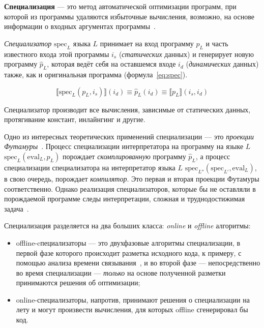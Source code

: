 {\bf Специализация} --- это метод автоматической оптимизации программ,
при которой из программы удаляются избыточные вычисления,
возможно, на основе информации о входных аргументах программы~\cite{jones}.


{\it Специализатор} $\text{spec}_L$ языка $L$ принимает на вход программу $p_L$ и часть известного входа этой
программы $i_s$ (\emph{статических} данных) и генерирует новую программу $\hat{p}_L$, которая ведёт себя на оставшемся
входе $i_d$ (\emph{динамических} данных) также, как и оригинальная программа (формула~\ref{eq:spec}).

\begin{equation}
  \llbracket \text{spec}_L(p_L, i_s) \rrbracket (i_d) \equiv \hat{p}_L (i_d) \equiv \llbracket p_L \rrbracket (i_s, i_d)
\label{eq:spec}
\end{equation}

Специализатор производит все вычисления, зависимые от статических данных,
протягивание констант, инлайнгинг и другие.

Одно из интересных теоретических применений специализации --- это
\emph{проекции Футамуры}~\cite{futamura}. Процесс специализации интерпретатора
на программу на языке $L$ $\text{spec}_L(\text{eval}_L, p_L)$
порождает \emph{скомплированную} программу $\hat{p}_L$, а процесс специализации
специализатора на интерпретатор языка $L$
$\text{spec}_{L''}(\text{spec}_{L'}, \text{eval}_L)$, в свою очередь,
порождает \emph{компилятор}. Это первая и вторая проекции Футамуры
соответственно. Однако реализация специализаторов, которые бы не оставляли
в порождаемой программе следы интерпретации, сложная и труднодостижимая
задача~\cite{jones}.

Специализация разделяется на два больших класса: \emph{online} и \emph{offline}
алгоритмы:
\begin{itemize}
\item offline-cпециализаторы --- это двухфазовые алгоритмы специализации,
     в первой фазе которого происходит разметка исходного кода, к примеру,
     с помощью анализа времени связывания~\cite{jones}, и во второй
     фазе --- непосредственно во время специализации --- \emph{только}
     на основе полученной разметки принимаются решения об оптимизации;
\item online-специализаторы, напротив, принимают решения о специализации
      на лету и могут произвести вычисления, для которых offline сгенерировал
      бы код.
\end{itemize}


